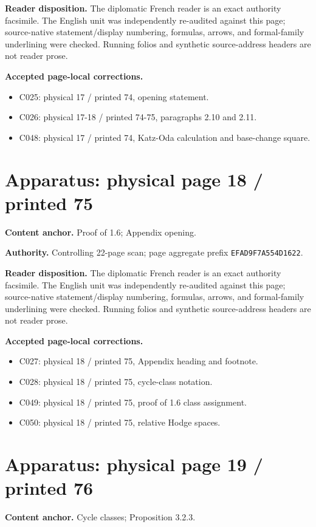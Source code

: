 \documentclass[10pt]{article}
\begin{document}
\textbf{Reader disposition.} The diplomatic French reader is an exact authority facsimile. The English unit was independently re-audited against this page; source-native statement/display numbering, formulas, arrows, and formal-family underlining were checked. Running folios and synthetic source-address headers are not reader prose.

\textbf{Accepted page-local corrections.} \begin{itemize}
\item C025: physical 17 / printed 74, opening statement.
\item C026: physical 17-18 / printed 74-75, paragraphs 2.10 and 2.11.
\item C048: physical 17 / printed 74, Katz-Oda calculation and base-change square.
\end{itemize}
\newpage
\setcounter{footnote}{0}
\fontsize{10.2pt}{12.04pt}\selectfont
\section*{Apparatus: physical page 18 / printed 75}
\textbf{Content anchor.} Proof of 1.6; Appendix opening.

\textbf{Authority.} Controlling 22-page scan; page aggregate prefix \texttt{EFAD9F7A554D1622}.

\textbf{Reader disposition.} The diplomatic French reader is an exact authority facsimile. The English unit was independently re-audited against this page; source-native statement/display numbering, formulas, arrows, and formal-family underlining were checked. Running folios and synthetic source-address headers are not reader prose.

\textbf{Accepted page-local corrections.} \begin{itemize}
\item C027: physical 18 / printed 75, Appendix heading and footnote.
\item C028: physical 18 / printed 75, cycle-class notation.
\item C049: physical 18 / printed 75, proof of 1.6 class assignment.
\item C050: physical 18 / printed 75, relative Hodge spaces.
\end{itemize}
\newpage
\setcounter{footnote}{0}
\fontsize{10.2pt}{12.04pt}\selectfont
\section*{Apparatus: physical page 19 / printed 76}
\textbf{Content anchor.} Cycle classes; Proposition 3.2.3.
\end{document}

